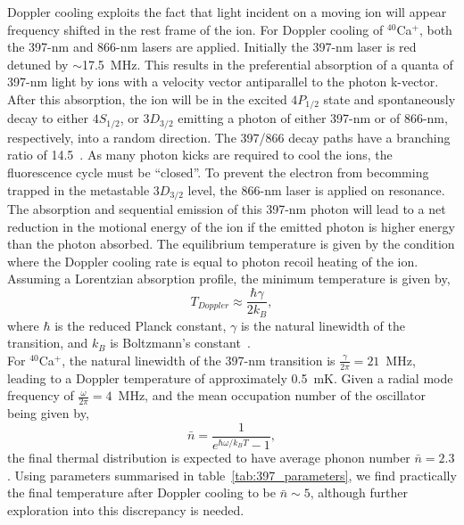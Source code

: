     Doppler cooling exploits the fact that light incident on a moving ion will
    appear frequency shifted in the rest frame of the ion. For Doppler cooling
    of $^{40}$Ca$^+$, both the 397-nm and 866-nm lasers are applied. Initially the 397-nm laser is red
    detuned by $\sim$17.5~MHz. This results in the preferential
    absorption of a quanta of 397-nm light by ions with a velocity vector
    antiparallel to the photon k-vector. After this absorption, the ion will be in the
    excited $4P_{1/2}$ state and spontaneously decay to either $4S_{1/2}$,
    or $3D_{3/2}$ emitting a photon of either 397-nm or of 866-nm,
    respectively, into a random direction. The 397/866 decay paths have a branching
    ratio of 14.5~\cite{ramm_precision_2013}. As many photon kicks are required to cool the ions, the fluorescence cycle must be ``closed''. To prevent the electron from becomming trapped in the metastable $3D_{3/2}$ level, the 866-nm laser is applied on resonance.  The absorption and sequential emission of this 397-nm photon
    will lead to a net reduction in the motional energy of the ion if the emitted photon
    is higher energy than the photon absorbed. The equilibrium
    temperature is given by the condition where the Doppler cooling rate is
    equal to photon recoil heating of the ion. Assuming a Lorentzian absorption
    profile, the minimum temperature is given by,
    \begin{equation}
    T_{Doppler} \approx \frac{\hbar\gamma}{2k_B},
    \end{equation}
    where $\hbar$ is the reduced Planck constant, $\gamma$ is the natural
    linewidth of the transition, and $k_B$ is Boltzmann's constant~\cite{}.\\ For
    $^{40}$Ca$^+$, the natural linewidth of the 397-nm transition is $\frac{\gamma}{2\pi} =
    21$~MHz, leading to a Doppler temperature of approximately 0.5~mK. Given a radial mode frequency of $\frac{\omega}{2\pi} = 4$~MHz, and the mean occupation number of the oscillator being given by,
    \begin{equation}
        \bar{n} = \frac{1}{e^{\hbar\omega/k_B T}-1},
    \end{equation}
    the final thermal distribution is expected to have average phonon number $\bar{n} = 2.3$.
    Using parameters summarised in table~\ref{tab:397_parameters}, we find practically the final temperature after Doppler cooling to be $\bar{n} \sim 5$, although further exploration into this discrepancy is needed.\\

